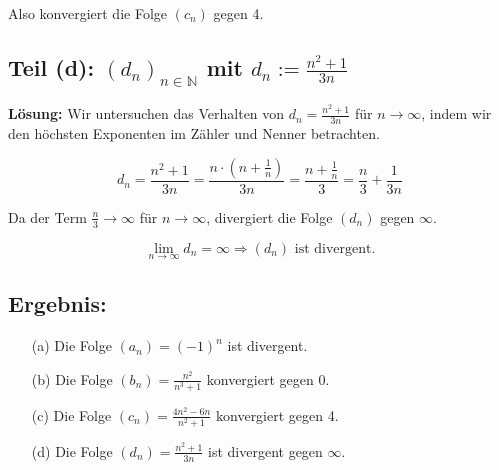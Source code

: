 \documentclass[11pt]{article}
\begin{document}
Also konvergiert die Folge \( (c_n) \) gegen 4.

\subsection*{Teil (d): \( (d_n)_{n \in \mathbb{N}} \) mit \( d_n := \frac{n^2 + 1}{3n} \)}

\textbf{Lösung:} Wir untersuchen das Verhalten von \( d_n = \frac{n^2 + 1}{3n} \) für \( n \to \infty \), indem wir den höchsten Exponenten im Zähler und Nenner betrachten.

\[
d_n = \frac{n^2 + 1}{3n} = \frac{n \cdot \left(n + \frac{1}{n}\right)}{3n} = \frac{n + \frac{1}{n}}{3} = \frac{n}{3} + \frac{1}{3n}
\]

Da der Term \( \frac{n}{3} \to \infty \) für \( n \to \infty \), divergiert die Folge \( (d_n) \) gegen \( \infty \).

\[
\lim_{n \to \infty} d_n = \infty \Rightarrow (d_n) \text{ ist divergent.}
\]

\subsection*{Ergebnis:}
\begin{enumerate}
    \item[(a)] Die Folge \( (a_n) = (-1)^n \) ist divergent.
    \item[(b)] Die Folge \( (b_n) = \frac{n^2}{n^3 + 1} \) konvergiert gegen 0.
    \item[(c)] Die Folge \( (c_n) = \frac{4n^2 - 6n}{n^2 + 1} \) konvergiert gegen 4.
    \item[(d)] Die Folge \( (d_n) = \frac{n^2 + 1}{3n} \) ist divergent gegen \( \infty \).
\end{enumerate}
\end{document}
